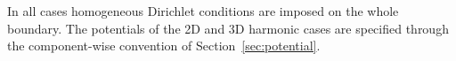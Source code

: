 \documentclass[pdflatex,sn-mathphys-num]{sn-jnl}
\theoremstyle{thmstyleone}%
\theoremstyle{thmstyletwo}%
\theoremstyle{thmstylethree}%
\begin{document}
\begin{appendices}
\noindent
In all cases homogeneous Dirichlet conditions are imposed on the whole boundary.
The potentials of the 2D and 3D harmonic cases are specified through the
component-wise convention of Section~\ref{sec:potential}.

\end{appendices}


\end{document}
